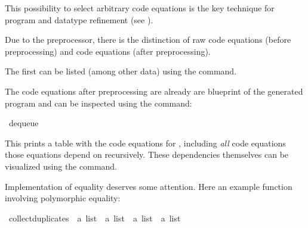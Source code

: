 \begin{isabellebody}
\begin{isamarkuptext}
  This possibility to select arbitrary code equations is the key
  technique for program and datatype refinement (see
  ).

  Due to the preprocessor, there is the distinction of raw code
  equations (before preprocessing) and code equations (after
  preprocessing).

  The first can be listed (among other data) using the \hypertarget{command.print-codesetup}{\hyperlink{command.print-codesetup}{\mbox{}}} command.

  The code equations after preprocessing are already are blueprint of
  the generated program and can be inspected using the \hyperlink{command.code-thms}{\mbox{}} command:%
\end{isamarkuptext}%
\isamarkuptrue%
%
\isadelimquote
%
\endisadelimquote
%
\isatagquote
{}\isamarkupfalse%
\ dequeue%
\endisatagquote
{\isafoldquote}%
%
\isadelimquote
%
\endisadelimquote
%
\begin{isamarkuptext}%
\noindent This prints a table with the code equations for , including \emph{all} code equations those equations depend
  on recursively.  These dependencies themselves can be visualized using
  the \hypertarget{command.code-deps}{\hyperlink{command.code-deps}{\mbox{}}} command.%
\end{isamarkuptext}%
\isamarkuptrue%
%
\isamarkuptrue%
%
\begin{isamarkuptext}%
Implementation of equality deserves some attention.  Here an example
  function involving polymorphic equality:%
\end{isamarkuptext}%
\isamarkuptrue%
%
\isadelimquote
%
\endisadelimquote
%
\isatagquote
{}\isamarkupfalse%
\ collect{}duplicates\ {}{}\ {}{}a\ list\ {}\ {}a\ list\ {}\ {}a\ list\ {}\ {}a\ list{}\ \isanewline

\end{isabellebody}
